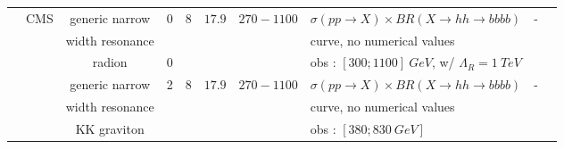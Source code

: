 \begin{table}[h!]
{\begin{tabular}{|l|l|c|c|c|c|c|l|c|c|}
\cline{2-10}
                    &CMS        &generic narrow            &0    &$8$        &$17.9$        &$270-1100$        &$\sigma(pp\rightarrow X)\times BR(X\rightarrow hh\rightarrow bbbb)$             &-    &\cite{Khachatryan:2015yea}\\
                    &        &width resonance        &    &        &        &            &curve, no numerical values                                &    &\\
                    &        &radion                &0    &        &        &            &obs : $[300 ; 1100]\ GeV$, w/ $\Lambda_R=1\ TeV$                    &    &\\
\cline{3-10}
                    &        &generic narrow            &2    &$8$        &$17.9$        &$270-1100$        &$\sigma(pp\rightarrow X)\times BR(X\rightarrow hh\rightarrow bbbb)$             &-    &\cite{Khachatryan:2015yea}\\
                    &        &width resonance        &    &        &        &            &curve, no numerical values                                &    &\\
                    &        &KK graviton            &    &        &        &            &obs : $[380 ; 830\ GeV]$                                &    &\\



\end{tabular}}
\end{table}
